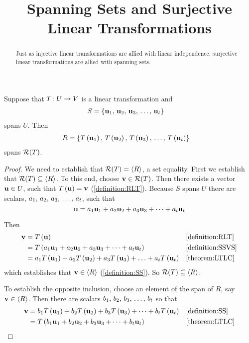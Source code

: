 \documentclass{ximera}
\title{Spanning Sets and Surjective Linear Transformations}
\begin{document}
\begin{abstract}
  Just as injective linear transformations are allied with linear independence, surjective linear transformations are allied with spanning sets.
\end{abstract}
\maketitle


\begin{theorem}
\label{theorem:SSRLT}

Suppose that $T\colon U\rightarrow V$ is a linear transformation and
\begin{align*}
S&=\left\{\mathbf{u}_{1},\,\mathbf{u}_{2},\,\mathbf{u}_{3},\,\ldots,\,\mathbf{u}_{t}\right\}
\end{align*}
spans $U$.  Then
\begin{align*}
R&=\left\{T\left(\mathbf{u}_1\right),\,T\left(\mathbf{u}_2\right),\,T\left(\mathbf{u}_3\right),\,\ldots,\,T\left(\mathbf{u}_t\right)\right\}
\end{align*}
spans $\mathcal{R}\!\left(T\right)$.

\begin{proof}
We need to establish that $\mathcal{R}\!\left(T\right)=\left\langle R\right\rangle$, a set equality.  First we establish that $\mathcal{R}\!\left(T\right)\subseteq\left\langle R\right\rangle$.  To this end, choose $\mathbf{v}\in\mathcal{R}\!\left(T\right)$.  Then there exists a vector $\mathbf{u}\in U$, such that $T\left(\mathbf{u}\right)=\mathbf{v}$ (\ref{definition:RLT}).  Because $S$ spans $U$ there are scalars, ${a}_{1},\,{a}_{2},\,{a}_{3},\,\ldots,\,{a}_{t}$, such that
\[
\mathbf{u}=a_{1}\mathbf{u}_{1}+a_{2}\mathbf{u}_{2}+a_{3}\mathbf{u}_{3}+\cdots +a_{t}\mathbf{u}_{t}
\]




Then
\begin{align*}
\mathbf{v}
&=T\left(\mathbf{u}\right)&&\ref{definition:RLT}\\
&=T\left(a_{1}\mathbf{u}_{1}+a_{2}\mathbf{u}_{2}+a_{3}\mathbf{u}_{3}+\cdots +a_{t}\mathbf{u}_{t}\right)&&\ref{definition:SSVS}\\
&=a_1T\left(\mathbf{u}_1\right)+a_2T\left(\mathbf{u}_2\right)+a_3T\left(\mathbf{u}_3\right)+\ldots+a_tT\left(\mathbf{u}_t\right)&&\ref{theorem:LTLC}\\
\end{align*}
which establishes that $\mathbf{v}\in\left\langle R\right\rangle$ (\ref{definition:SS}).  So $\mathcal{R}\!\left(T\right)\subseteq\left\langle R\right\rangle$.



To establish the opposite inclusion, choose an element of the span of $R$, say $\mathbf{v}\in\left\langle R\right\rangle$.  Then there are scalars ${b}_{1},\,{b}_{2},\,{b}_{3},\,\ldots,\,{b}_{t}$ so that
\begin{align*}
\mathbf{v}
&=b_1T\left(\mathbf{u}_1\right)+b_2T\left(\mathbf{u}_2\right)+b_3T\left(\mathbf{u}_3\right)+\cdots+b_tT\left(\mathbf{u}_t\right)
&&\ref{definition:SS}\\
&=T\left(b_{1}\mathbf{\mathbf{u}}_{1}+b_{2}\mathbf{\mathbf{u}}_{2}+b_{3}\mathbf{\mathbf{u}}_{3}+\cdots +b_{t}\mathbf{\mathbf{u}}_{t}\right)&&\ref{theorem:LTLC}
\end{align*}





\end{proof}
\end{theorem}
\end{document}
